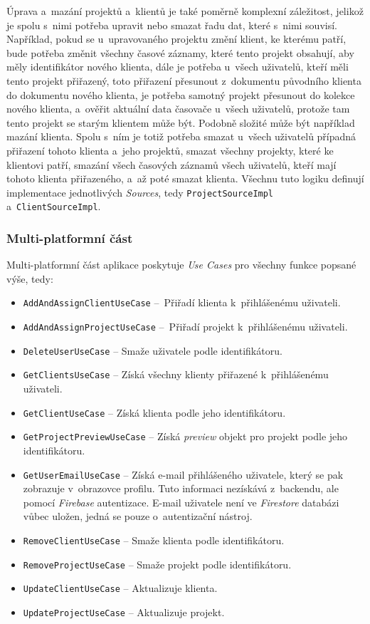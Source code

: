 Úprava a~mazání projektů a~klientů je také poměrně komplexní záležitost, jelikož je spolu s~nimi potřeba upravit nebo smazat řadu dat, které s~nimi souvisí. Například, pokud se u~upravovaného projektu změní klient, ke kterému patří, bude potřeba změnit všechny časové záznamy, které tento projekt obsahují, aby měly identifikátor nového klienta, dále je potřeba u~všech uživatelů, kteří měli tento projekt přiřazený, toto přiřazení přesunout z~dokumentu původního klienta do dokumentu nového klienta, je potřeba samotný projekt přesunout do kolekce nového klienta, a~ověřit aktuální data časovače u~všech uživatelů, protože tam tento projekt se starým klientem může být. Podobně složité může být například mazání klienta. Spolu s~ním je totiž potřeba smazat u~všech uživatelů případná přiřazení tohoto klienta a~jeho projektů, smazat všechny projekty, které ke klientovi patří, smazání všech časových záznamů všech uživatelů, kteří mají tohoto klienta přiřazeného, a~až poté smazat klienta. Všechnu tuto logiku definují implementace jednotlivých \emph{Sources}, tedy \texttt{ProjectSourceImpl} a~\texttt{ClientSourceImpl}.

\subsubsection{Multi-platformní část}

Multi-platformní část aplikace poskytuje \emph{Use Cases} pro všechny funkce popsané výše, tedy:
\begin{itemize}
\item\texttt{AddAndAssignClientUseCase} – Přiřadí klienta k~přihlášenému uživateli.
\item\texttt{AddAndAssignProjectUseCase} – Přiřadí projekt k~přihlášenému uživateli.
\item\texttt{DeleteUserUseCase} – Smaže uživatele podle identifikátoru.
\item\texttt{GetClientsUseCase} – Získá všechny klienty přiřazené k~přihlášenému uživateli.
\item\texttt{GetClientUseCase} – Získá klienta podle jeho identifikátoru.
\item\texttt{GetProjectPreviewUseCase} – Získá \emph{preview} objekt pro projekt podle jeho identifikátoru.
\item\texttt{GetUserEmailUseCase} – Získá e-mail přihlášeného uživatele, který se pak zobrazuje v~obrazovce profilu. Tuto informaci nezískává z~backendu, ale pomocí \emph{Firebase} autentizace. E-mail uživatele není ve \emph{Firestore} databázi vůbec uložen, jedná se pouze o~autentizační nástroj.
\item\texttt{RemoveClientUseCase} – Smaže klienta podle identifikátoru.
\item\texttt{RemoveProjectUseCase} – Smaže projekt podle identifikátoru.
\item\texttt{UpdateClientUseCase} – Aktualizuje klienta.
\item\texttt{UpdateProjectUseCase} – Aktualizuje projekt.
\end{itemize}


